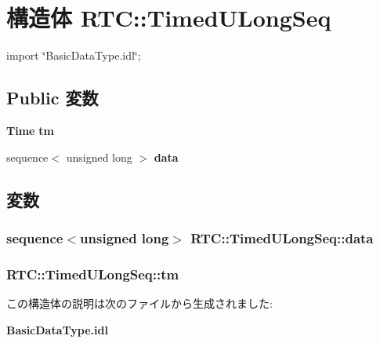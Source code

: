 \section{構造体 RTC::TimedULongSeq}
\label{structRTC_1_1TimedULongSeq}


{\ttfamily import \char`\"{}BasicDataType.idl\char`\"{};}

\subsection*{Public 変数}
\begin{DoxyCompactItemize}
\item 
{\bf Time} {\bf tm}
\item 
sequence$<$ unsigned long $>$ {\bf data}
\end{DoxyCompactItemize}


\subsection{変数}
\subsubsection[{data}]{\setlength{\rightskip}{0pt plus 5cm}sequence$<$unsigned long$>$ {\bf RTC::TimedULongSeq::data}}\label{structRTC_1_1TimedULongSeq_af252ccd0ee4dcc6eb9e0690f20ca998f}
\subsubsection[{tm}]{ {\bf RTC::TimedULongSeq::tm}}\label{structRTC_1_1TimedULongSeq_ad6641cf65f9493ae41641ad5b9e9a363}


この構造体の説明は次のファイルから生成されました:\begin{DoxyCompactItemize}
\item 
{\bf BasicDataType.idl}\end{DoxyCompactItemize}
